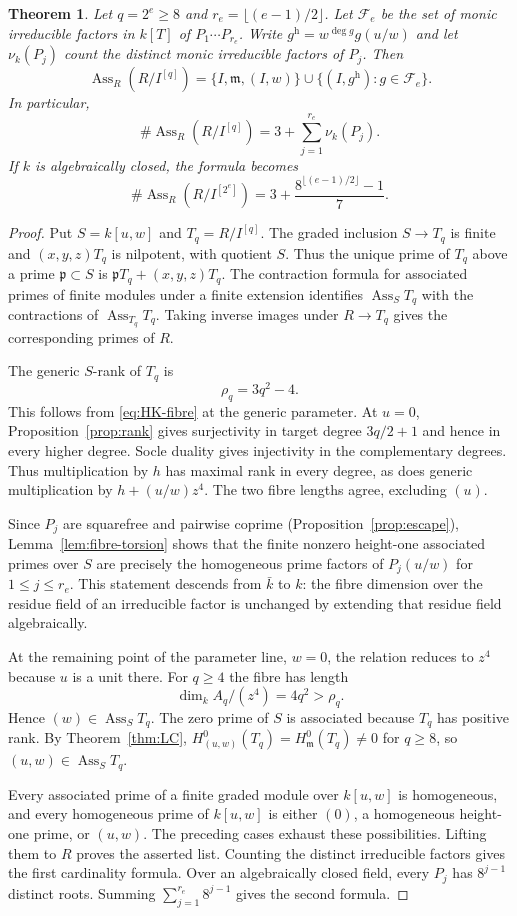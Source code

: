\documentclass[11pt,a4paper,reqno]{amsart}
\numberwithin{equation}{section}
\theoremstyle{plain}
\newtheorem{theorem}{Theorem}[section]
\theoremstyle{definition}
\theoremstyle{remark}
\newcommand{\mm}{\mathfrak m}
\DeclareMathOperator{\Ass}{Ass}
\begin{document}
\begin{theorem}\label{thm:ass-exact}
Let $q=2^e\geq8$ and $r_e=\lfloor(e-1)/2\rfloor$. Let $\mathcal F_e$
be the set of monic irreducible factors in $k[T]$ of
$P_1\cdots P_{r_e}$. Write $g^{\mathrm h}=w^{\deg g}g(u/w)$ and let
$\nu_k(P_j)$ count the distinct monic irreducible factors of $P_j$.
Then
\[
 \Ass_R(R/I^{[q]})=\{I,\mm,(I,w)\}
 \cup\{(I,g^{\mathrm h}):g\in\mathcal F_e\}.
\]
In particular,
\[
\#\Ass_R(R/I^{[q]})
=3+\sum_{j=1}^{r_e}\nu_k(P_j).
\]
If $k$ is algebraically closed, the formula becomes
\[
\#\Ass_R(R/I^{[2^e]})
=3+\frac{8^{\lfloor(e-1)/2\rfloor}-1}{7}.
\]
\end{theorem}
\begin{proof}
Put $S=k[u,w]$ and $T_q=R/I^{[q]}$.
The graded inclusion $S\to T_q$ is finite and $(x,y,z)T_q$ is nilpotent,
with quotient $S$. Thus the unique prime of $T_q$ above a prime
$\mathfrak p\subset S$ is $\mathfrak pT_q+(x,y,z)T_q$.
The contraction formula for associated primes of finite modules under
a finite extension identifies $\Ass_S T_q$ with the contractions of
$\Ass_{T_q}T_q$. Taking inverse images under $R\to T_q$ gives the
corresponding primes of $R$.

The generic $S$-rank of $T_q$ is
\begin{equation}\label{eq:generic-fibre-length}
\rho_q=3q^2-4.
\end{equation}
This follows from \eqref{eq:HK-fibre} at the generic parameter.
At $u=0$, Proposition~\ref{prop:rank} gives surjectivity in target
degree $3q/2+1$ and hence in every higher degree. Socle duality gives
injectivity in the complementary degrees. Thus multiplication by $h$
has maximal rank in every degree, as does generic multiplication by
$h+(u/w)z^4$. The two fibre lengths agree, excluding $(u)$.

Since $P_j$ are squarefree and pairwise coprime
(Proposition~\ref{prop:escape}), Lemma~\ref{lem:fibre-torsion}
shows that the finite nonzero height-one associated primes over $S$
are precisely the homogeneous prime factors of $P_j(u/w)$ for
$1\leq j\leq r_e$. This statement descends from $\bar k$ to $k$:
the fibre dimension over the residue field of an irreducible factor
is unchanged by extending that residue field algebraically.

At the remaining point of the parameter line, $w=0$, the relation
reduces to $z^4$ because $u$ is a unit there. For $q\geq4$ the fibre
has length
\[
\dim_k A_q/(z^4)=4q^2>\rho_q.
\]
Hence $(w)\in\Ass_S T_q$.
The zero prime of $S$ is associated because $T_q$ has positive
rank. By Theorem~\ref{thm:LC},
$H^0_{(u,w)}(T_q)=H^0_{\mathfrak m}(T_q)\ne0$ for $q\geq8$, so $(u,w)\in\Ass_S T_q$.

Every associated prime of a finite graded module over $k[u,w]$
is homogeneous, and every homogeneous prime of $k[u,w]$ is either
$(0)$, a homogeneous height-one prime, or $(u,w)$.
The preceding cases exhaust these possibilities. Lifting them to
$R$ proves the asserted list. Counting the distinct irreducible
factors gives the first cardinality formula. Over an algebraically
closed field, every $P_j$ has $8^{j-1}$ distinct roots. Summing
$\sum_{j=1}^{r_e}8^{j-1}$ gives the second formula.
\end{proof}
\end{document}
